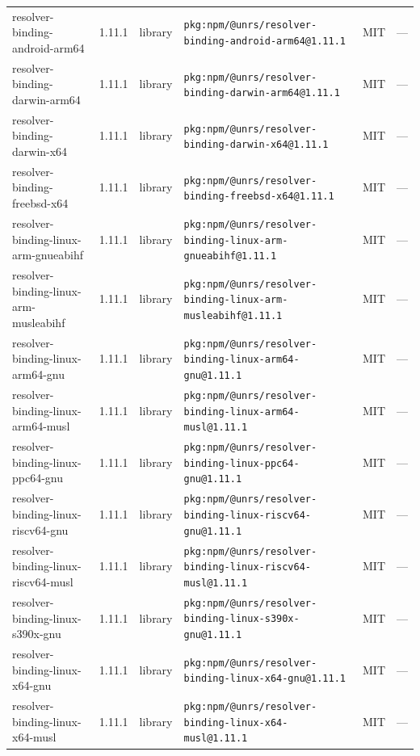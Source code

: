 \documentclass[11pt,a4paper]{article}
\begin{document}
\begin{longtable}{|p{4cm}|p{2cm}|p{1.6cm}|p{5cm}|p{1.5cm}|p{3.5cm}|}
\raggedright resolver-binding-android-arm64 & 1.11.1 & library & \small\texttt{pkg:npm/@unrs/resolver-binding-android-arm64@1.11.1} & MIT & \small — \\
\raggedright resolver-binding-darwin-arm64 & 1.11.1 & library & \small\texttt{pkg:npm/@unrs/resolver-binding-darwin-arm64@1.11.1} & MIT & \small — \\
\raggedright resolver-binding-darwin-x64 & 1.11.1 & library & \small\texttt{pkg:npm/@unrs/resolver-binding-darwin-x64@1.11.1} & MIT & \small — \\
\raggedright resolver-binding-freebsd-x64 & 1.11.1 & library & \small\texttt{pkg:npm/@unrs/resolver-binding-freebsd-x64@1.11.1} & MIT & \small — \\
\raggedright resolver-binding-linux-arm-gnueabihf & 1.11.1 & library & \small\texttt{pkg:npm/@unrs/resolver-binding-linux-arm-gnueabihf@1.11.1} & MIT & \small — \\
\raggedright resolver-binding-linux-arm-musleabihf & 1.11.1 & library & \small\texttt{pkg:npm/@unrs/resolver-binding-linux-arm-musleabihf@1.11.1} & MIT & \small — \\
\raggedright resolver-binding-linux-arm64-gnu & 1.11.1 & library & \small\texttt{pkg:npm/@unrs/resolver-binding-linux-arm64-gnu@1.11.1} & MIT & \small — \\
\raggedright resolver-binding-linux-arm64-musl & 1.11.1 & library & \small\texttt{pkg:npm/@unrs/resolver-binding-linux-arm64-musl@1.11.1} & MIT & \small — \\
\raggedright resolver-binding-linux-ppc64-gnu & 1.11.1 & library & \small\texttt{pkg:npm/@unrs/resolver-binding-linux-ppc64-gnu@1.11.1} & MIT & \small — \\
\raggedright resolver-binding-linux-riscv64-gnu & 1.11.1 & library & \small\texttt{pkg:npm/@unrs/resolver-binding-linux-riscv64-gnu@1.11.1} & MIT & \small — \\
\raggedright resolver-binding-linux-riscv64-musl & 1.11.1 & library & \small\texttt{pkg:npm/@unrs/resolver-binding-linux-riscv64-musl@1.11.1} & MIT & \small — \\
\raggedright resolver-binding-linux-s390x-gnu & 1.11.1 & library & \small\texttt{pkg:npm/@unrs/resolver-binding-linux-s390x-gnu@1.11.1} & MIT & \small — \\
\raggedright resolver-binding-linux-x64-gnu & 1.11.1 & library & \small\texttt{pkg:npm/@unrs/resolver-binding-linux-x64-gnu@1.11.1} & MIT & \small — \\
\raggedright resolver-binding-linux-x64-musl & 1.11.1 & library & \small\texttt{pkg:npm/@unrs/resolver-binding-linux-x64-musl@1.11.1} & MIT & \small — \\

\end{longtable}
\end{document}
